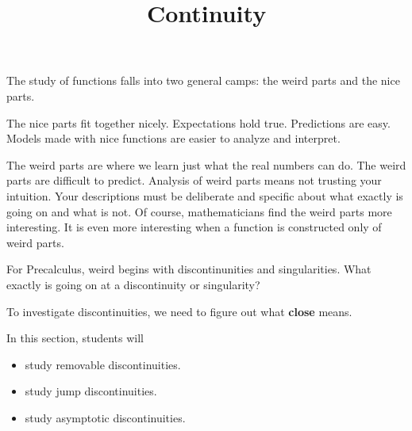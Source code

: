 \documentclass{ximera}
\title{Continuity}
\begin{document}
\begin{abstract}
\end{abstract}
\maketitle






The study of functions falls into two general camps: the weird parts and the nice parts.  

The nice parts fit together nicely. Expectations hold true. Predictions are easy. Models made with nice functions are easier to analyze and interpret.


The weird parts are where we learn just what the real numbers can do.  The weird parts are difficult to predict. Analysis of weird parts means not trusting your intuition.  Your descriptions must be deliberate and specific about what exactly is going on and what is not.  Of course, mathematicians find the weird parts more interesting.  It is even more interesting when a function is constructed only of weird parts.


For Precalculus, weird begins with discontinunities and singularities.  What exactly is going on at a discontinuity or singularity?


To investigate discontinuities, we need to figure out what \textbf{close} means.







\begin{sectionOutcomes}
In this section, students will 

\begin{itemize}
\item study removable discontinuities.
\item study jump discontinuities.
\item study asymptotic discontinuities.

\end{itemize}
\end{sectionOutcomes}
\end{document}
